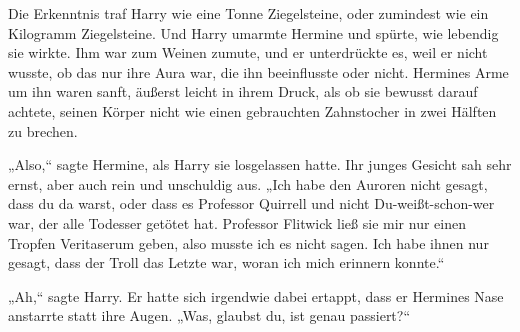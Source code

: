 Die Erkenntnis traf Harry wie eine Tonne Ziegelsteine, oder zumindest wie ein Kilogramm Ziegelsteine.
Und Harry umarmte Hermine und spürte, wie lebendig sie wirkte. Ihm war zum Weinen zumute, und er unterdrückte es, weil er nicht wusste, ob das nur ihre Aura war, die ihn beeinflusste oder nicht.
Hermines Arme um ihn waren sanft, äußerst leicht in ihrem Druck, als ob sie bewusst darauf achtete, seinen Körper nicht wie einen gebrauchten Zahnstocher in zwei Hälften zu brechen.

„Also,“ sagte Hermine, als Harry sie losgelassen hatte. Ihr junges Gesicht sah sehr ernst, aber auch rein und unschuldig aus. „Ich habe den Auroren nicht gesagt, dass du da warst, oder dass es Professor Quirrell und nicht Du-weißt-schon-wer war, der alle Todesser getötet hat. Professor Flitwick ließ sie mir nur einen Tropfen Veritaserum geben, also musste ich es nicht sagen. Ich habe ihnen nur gesagt, dass der Troll das Letzte war, woran ich mich erinnern konnte.“

„Ah,“ sagte Harry. Er hatte sich irgendwie dabei ertappt, dass er Hermines Nase anstarrte statt ihre Augen. „Was, glaubst du, ist genau passiert?“

